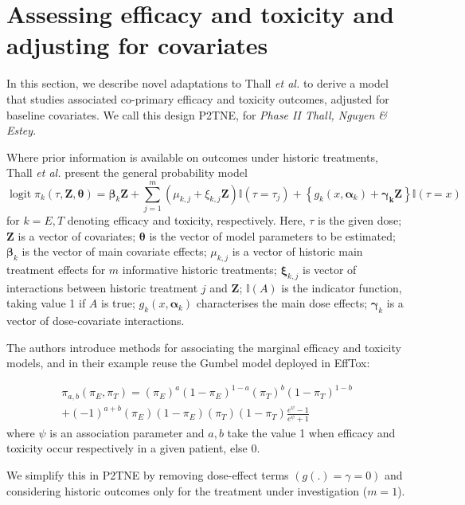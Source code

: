 \documentclass[graybox]{svmult}
\DeclareMathOperator{\logit}{logit}
\begin{document}
\section{Assessing efficacy and toxicity and adjusting for covariates}
\label{s:bebop:alternative}
In this section, we describe novel adaptations to Thall \textit{et al.}\cite{Thall2008} to derive a model that studies associated co-primary efficacy and toxicity outcomes, adjusted for baseline covariates. 
We call this design P2TNE, for \textit{Phase II Thall, Nguyen \& Estey}.

Where prior information is available on outcomes under historic treatments, Thall \textit{et al.} present the general probability model
\begin{equation}
\label{eqn:bebop:tne}
\logit{\pi_k}(\tau, \boldsymbol{Z}, \boldsymbol{\theta}) = \boldsymbol{\beta}_k \boldsymbol{Z} + \sum_{j=1}^m (\mu_{k, j} + \xi_{k, j} \boldsymbol{Z}) \mathbb{I}(\tau = \tau_j) + \left\{ g_k(x, \boldsymbol{\alpha}_k) + \boldsymbol{\gamma_k} \boldsymbol{Z} \right\} \mathbb{I}(\tau = x)
\end{equation}
for $k = E, T$ denoting efficacy and toxicity, respectively.
Here, $\tau$ is the given dose; $\boldsymbol{Z}$ is a vector of covariates; $\boldsymbol{\theta}$ is the vector of model parameters to be estimated; $\boldsymbol{\beta}_k$ is the vector of main covariate effects; $\mu_{k,j}$ is a vector of historic main treatment effects for $m$ informative historic treatments; $\boldsymbol{\xi}_{k, j}$ is vector of interactions between historic treatment $j$ and $\boldsymbol{Z}$;  $\mathbb{I}(A)$ is the indicator function, taking value 1 if $A$ is true; $g_k(x, \boldsymbol{\alpha}_k)$ characterises the main dose effects; $\boldsymbol{\gamma}_{k}$ is a vector of dose-covariate interactions.

The authors introduce methods for associating the marginal efficacy and toxicity models, and in their example reuse the Gumbel model deployed in EffTox\cite{Thall2004}:

\begin{multline}
\label{eqn:et:full_model}
\pi_{a,b}(\pi_E, \pi_T) = (\pi_E)^a (1-\pi_E)^{1-a} (\pi_T)^b (1-\pi_T)^{1-b} \\
+ (-1)^{a+b} (\pi_E) (1-\pi_E) (\pi_T) (1-\pi_T) \frac{e^\psi-1}{e^\psi+1}
\end{multline}
where $\psi$ is an association parameter and $a, b$ take the value 1 when efficacy and toxicity occur respectively in a given patient, else 0.

We simplify this in P2TNE by removing dose-effect terms $(g(.) = \gamma = 0)$ and considering historic outcomes only for the treatment under investigation ($m = 1$).
\end{document}
